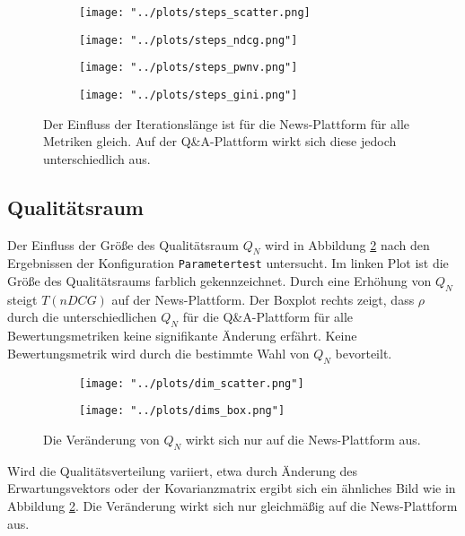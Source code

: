 \begin{figure}[!htb]
	\begin{subfigure}{0.5\textwidth}
		\texttt{[image: "../plots/steps\_scatter.png]}%
	\end{subfigure}
	\hfill
	\begin{subfigure}{0.5\textwidth}
		\texttt{[image: "../plots/steps\_ndcg.png"]}%
	\end{subfigure}
	\begin{subfigure}{0.5\textwidth}
		\texttt{[image: "../plots/steps\_pwnv.png"]}%
	\end{subfigure}
	\hfill
	\begin{subfigure}{0.5\textwidth}
		\texttt{[image: "../plots/steps\_gini.png"]}%
	\end{subfigure}
	\caption{Der Einfluss der Iterationslänge ist für die News-Plattform für alle Metriken gleich. Auf der Q\&A-Plattform wirkt sich diese jedoch unterschiedlich aus.}
	\label{fig:steps}
\end{figure}

\subsection{Qualitätsraum}

Der Einfluss der Größe des Qualitätsraum $Q_N$ wird in Abbildung \ref{fig:qual} nach den Ergebnissen der Konfiguration \texttt{Parametertest} untersucht. Im linken Plot ist die Größe des Qualitätsraums farblich gekennzeichnet. Durch eine Erhöhung von $Q_N$ steigt $T(nDCG)$ auf der News-Plattform. Der Boxplot rechts zeigt, dass $\rho$ durch die unterschiedlichen $Q_N$ für die Q\&A-Plattform für alle Bewertungsmetriken keine signifikante Änderung erfährt. Keine Bewertungsmetrik wird durch die bestimmte Wahl von $Q_N$ bevorteilt.

\begin{figure}[!h]
	\begin{subfigure}{0.5\textwidth}
		\texttt{[image: "../plots/dim\_scatter.png"]}
	\end{subfigure}
	\begin{subfigure}{0.5\textwidth}
		\texttt{[image: "../plots/dims\_box.png"]}
	\end{subfigure}
	\caption{Die Veränderung von $Q_N$ wirkt sich nur auf die News-Plattform aus.}
	\label{fig:qual}	
\end{figure}

Wird die Qualitätsverteilung variiert, etwa durch Änderung des Erwartungsvektors oder der Kovarianzmatrix ergibt sich ein ähnliches Bild wie in Abbildung \ref{fig:qual}. Die Veränderung wirkt sich nur gleichmäßig auf die News-Plattform aus. 

